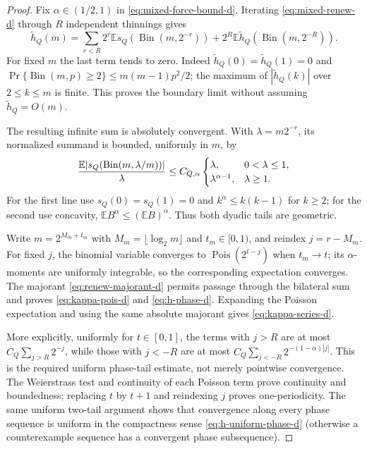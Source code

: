 \documentclass[11pt]{article}
\numberwithin{equation}{section}
\newcommand{\E}{\mathbb E}\newcommand{\Pp}{\mathbb P}
\newcommand{\1}{\mathbf 1}\newcommand{\F}{\mathcal F}\newcommand{\D}{\mathcal D}
\begin{document}
\begin{proof}
Fix $\alpha\in(1/2,1)$ in \eqref{eq:mixed-force-bound-d}.  Iterating
\eqref{eq:mixed-renew-d} through $R$ independent thinnings gives
\begin{equation}
 \widetilde h_Q(m)=\sum_{r<R}2^r\E s_Q(\operatorname {Bin}(m,2^{-r}))
 +2^R\E\widetilde h_Q(\operatorname {Bin}(m,2^{-R})). \label{eq:h-iterate-d}
\end{equation}
For fixed $m$ the last term tends to zero.  Indeed
$\widetilde h_Q(0)=\widetilde h_Q(1)=0$ and
$\Pr\{\operatorname {Bin}(m,p)\ge2\}\le m(m-1)p^2/2$;
the maximum of $|\widetilde h_Q(k)|$ over $2\le k\le m$ is finite.  This
proves the boundary limit without assuming $\widetilde h_Q=O(m)$.

The resulting infinite sum is absolutely convergent.  With
$\lambda=m2^{-r}$, its normalized summand is bounded, uniformly in $m$, by
\begin{equation}
 {\E|s_Q(\operatorname {Bin}(m,\lambda/m))|\over\lambda}
 \le C_{Q,\alpha}\begin{cases}\lambda,&0<\lambda\le1,\\
 \lambda^{\alpha-1},&\lambda\ge1.
 \end{cases}                                           \label{eq:renew-majorant-d}
\end{equation}
For the first line use $s_Q(0)=s_Q(1)=0$ and
$k^\alpha\le k(k-1)$ for $k\ge2$; for the second use concavity,
$\E B^\alpha\le(\E B)^\alpha$.  Thus both dyadic tails are geometric.

Write $m=2^{M_m+t_m}$ with $M_m=\lfloor\log_2m\rfloor$ and $t_m\in[0,1)$,
and reindex $j=r-M_m$.  For fixed $j$, the binomial variable converges to
$\operatorname {Pois}(2^{t-j})$ when $t_m\to t$; its $\alpha$-moments are
uniformly integrable, so the corresponding expectation converges.  The
majorant \eqref{eq:renew-majorant-d} permits passage through the bilateral
sum and proves \eqref{eq:kappa-pois-d} and \eqref{eq:h-phase-d}.
Expanding the Poisson expectation and using the same absolute majorant gives
\eqref{eq:kappa-series-d}.

More explicitly, uniformly for $t\in[0,1]$, the terms with $j>R$ are at
most $C_Q\sum_{j>R}2^{-j}$, while those with $j<-R$ are at most
$C_Q\sum_{j<-R}2^{-(1-\alpha)|j|}$.  This is the required uniform phase-tail
estimate, not merely pointwise convergence.  The Weierstrass test and
continuity of each Poisson term prove continuity and boundedness; replacing
$t$ by $t+1$ and reindexing $j$ proves one-periodicity.  The same uniform
two-tail argument shows that convergence along every phase sequence is
uniform in the compactness sense \eqref{eq:h-uniform-phase-d} (otherwise a
counterexample sequence has a convergent phase subsequence).


\end{proof}
\end{document}

